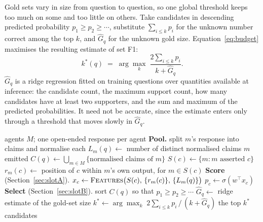 \documentclass{article}
\begin{document}
Gold sets vary in size from question to question, so one global threshold keeps too much
on some and too little on others. Take candidates in descending predicted probability
$p_1 \geq p_2 \geq \cdots$, substitute $\sum_{i \leq k} p_i$ for the unknown number
correct among the top $k$, and $\hat{G}_q$ for the unknown gold size.
Equation~\ref{eq:budget} maximises the resulting estimate of set F1:
\begin{equation}
\label{eq:budget}
  k^*(q) \;=\; \arg\max_k \; \frac{2 \sum_{i \leq k} p_i}{k + \hat{G}_q}.
\end{equation}
$\hat{G}_q$ is a ridge regression fitted on training questions over quantities available
at inference: the candidate count, the maximum support count, how many candidates have
at least two supporters, and the sum and maximum of the predicted probabilities. It need
not be accurate, since the estimate enters only through a threshold that moves slowly in
$\hat{G}_q$.


\begin{algorithm}[t]
\caption{Behavioural aggregation for one question $q$.}
\label{alg:beh}
\begin{algorithmic}[1]
\Require agents $M$; one open-ended response per agent
\Statex \textbf{Pool.}
  \State split $m$'s response into claims and normalise each
  \State $L_m(q) \gets$ number of distinct normalised claims $m$ emitted
\EndFor
\State $C(q) \gets \bigcup_{m \in M} \{\text{normalised claims of } m\}$
  \State $S(c) \gets \{m : m \text{ asserted } c\}$
  \State $r_m(c) \gets$ position of $c$ within $m$'s own output, for $m \in S(c)$
\EndFor
\Statex \textbf{Score} (Section~\ref{sec:slotA}).
  \State $x_c \gets \textsc{Features}\big(S(c),\, \{r_m(c)\},\, \{L_m(q)\}\big)$
  \State $p_c \gets \sigma(w^\top x_c)$ 
\EndFor
\Statex \textbf{Select} (Section~\ref{sec:slotB}).
\State sort $C(q)$ so that $p_1 \geq p_2 \geq \cdots$
\State $\hat{G}_q \gets$ ridge estimate of the gold-set size
\State $k^{*} \gets \arg\max_{k}\; 2\sum_{i \leq k} p_i \,/\, (k + \hat{G}_q)$
\State \Return the top $k^{*}$ candidates
\end{algorithmic}
\end{algorithm}
\end{document}
